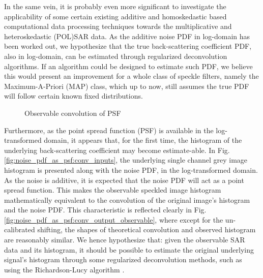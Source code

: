 In
                the same vein, it is probably even more significant to
                investigate the applicability of some certain existing
                additive and homoskedastic based computational data
                processing techniques towards the multiplicative and
                heteroskedastic (POL)SAR data.
As the additive noise PDF in log-domain has been worked out, we hypothesize that the true back-scattering coefficient PDF, also in log-domain, can be estimated through regularized deconvolution algorithms.
If an algorithm could be designed to estimate such PDF, we believe this would present an improvement for a whole class of speckle filters, namely the Maximum-A-Priori (MAP) class, which up to now, still assumes the true PDF will follow certain known fixed distributions.

\begin{figure}[ht]
\centering
	\hfill
\caption{Observable convolution of PSF}
\label{fig:noise_pdf_as_psf}
\end{figure}
  
Furthermore, as the point spread function (PSF) is available in the log-transformed domain, it appears that, for the first time, the histogram of the underlying back-scattering coefficient may become estimate-able. 
In Fig. 
	\ref{fig:noise_pdf_as_psf:conv_inputs}, 
the underlying single channel grey image histogram is presented along with the noise PDF, in the log-transformed domain. 
As the noise is additive, it is expected that the noise PDF will act as a point spread function.
This makes the observable speckled image histogram mathematically equivalent to the convolution of the original image's histogram and the noise PDF.
This characteristic is reflected clearly in Fig. 
	\ref{fig:noise_pdf_as_psf:conv_output_observable}, 
where except for the un-calibrated shifting, the shapes of theoretical convolution and observed histogram are reasonably similar.
We hence hypothesize that: given the observable SAR data and its histogram, it should be possible to estimate the original underlying signal's histogram through some regularized deconvolution methods,
  such as using the Richardson-Lucy algorithm \cite{Richardson_1972_JOptSocAm, Lucy_1974_JAstronomical}.

